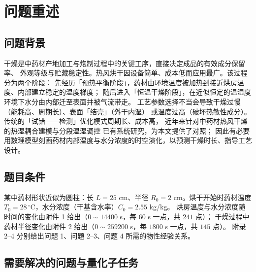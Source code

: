 \documentclass[withoutpreface,bwprint]{cumcmthesis}
\begin{document}
\section{问题重述}

\subsection{问题背景}

干燥是中药材产地加工与炮制过程中的关键工序，直接决定成品的有效成分保留率、
外观等级与贮藏稳定性。热风烘干因设备简单、成本低而应用最广。该过程分为两个阶段：
先经历「预热平衡阶段」，药材由环境温度被加热到接近烘房温度、内部建立稳定的温度梯度；
随后进入「恒温干燥阶段」，在近似恒定的温湿度环境下水分由内部迁至表面并被气流带走。
工艺参数选择不当会导致干燥过慢（能耗高、周期长）、表面「结壳」（外干内湿）
或温度过高（破坏热敏性成分）。传统的「试错——检测」优化模式周期长、成本高，
近年来针对中药材热风干燥的热湿耦合建模\cite{ao2026modeling}与分段温湿调控
\cite{ju2019stepdown}已有系统研究，为本文提供了对照；
因此有必要用数理模型刻画药材内部温度与水分浓度的时空演化，以预测干燥时长、指导工艺设计。

\subsection{题目条件}

某中药材形状近似为圆柱：长 $L=25$ cm、半径 $R_0=2$ cm。烘干开始时药材温度
$T_0=28\,^\circ$C，水分浓度（干基含水率）$C_0=2.55$ kg/kg。
烘房温度与水分浓度随时间的变化由附件 1 给出（$0\sim14400$ s，每 $60$ s 一点，共 $241$ 点）；
干燥过程中药材半径变化由附件 2 给出（$0\sim259200$ s，每 $1800$ s 一点，共 $145$ 点）。
附录 2--4 分别给出问题 1、问题 2--3、问题 4 所需的物性经验关系。

\subsection{需要解决的问题与量化子任务}
\end{document}
